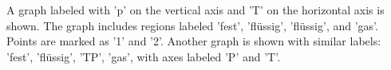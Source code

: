 A graph labeled with 'p' on the vertical axis and 'T' on the horizontal axis is shown. The graph includes regions labeled 'fest', 'flüssig', 'flüssig', and 'gas'. Points are marked as '1' and '2'. Another graph is shown with similar labels: 'fest', 'flüssig', 'TP', 'gas', with axes labeled 'P' and 'T'.